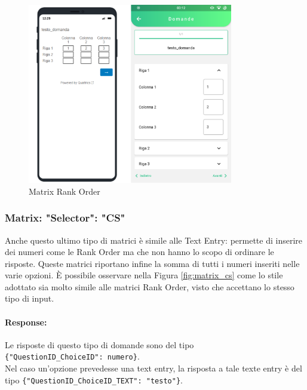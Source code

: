 \begin{figure}[h!]
\centering
\includegraphics[width=0.8\textwidth]{img/matrix_ro}
\caption{Matrix Rank Order}
\label{fig:matrix_ro}
\end{figure}

\clearpage
\subsubsection{Matrix: "Selector": "CS"}
Anche questo ultimo tipo di matrici è simile alle Text Entry: permette di inserire dei numeri come le Rank Order ma che non hanno lo scopo di ordinare le risposte. Queste matrici riportano infine la somma di tutti i numeri inseriti nelle varie opzioni. È possibile osservare nella Figura \ref{fig:matrix_cs} come lo stile adottato sia molto simile alle matrici Rank Order, visto che accettano lo stesso tipo di input.

\paragraph{Response:}
Le risposte di questo tipo di domande sono del tipo\\ \texttt{\{"QuestionID\_ChoiceID": numero\}}.\\Nel caso un'opzione prevedesse una text entry, la risposta a tale texte entry è del tipo \texttt{\{"QuestionID\_ChoiceID\_TEXT": "testo"\}}.

